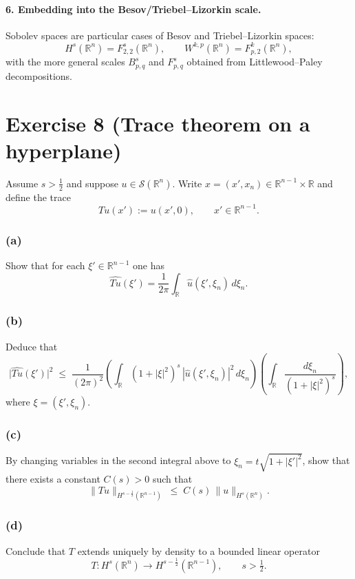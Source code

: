 \documentclass[12pt,a4paper]{article}
\theoremstyle{plain}
\theoremstyle{definition}
\theoremstyle{remark}
\theoremstyle{remark}
\begin{document}
\medskip

\paragraph{6. Embedding into the Besov/Triebel--Lizorkin scale.}
Sobolev spaces are particular cases of Besov and Triebel--Lizorkin spaces:
\[
H^s(\mathbb R^n) = F_{2,2}^s(\mathbb R^n),\qquad
W^{k,p}(\mathbb R^n) = F_{p,2}^k(\mathbb R^n),
\]
with the more general scales $B_{p,q}^s$ and $F_{p,q}^s$ obtained from Littlewood--Paley decompositions.

\section*{Exercise 8 (Trace theorem on a hyperplane)}

Assume $s>\tfrac12$ and suppose $u\in\mathcal S(\mathbb R^n)$.
Write $x=(x',x_n)\in\mathbb R^{n-1}\times\mathbb R$ and define the trace
\[
Tu(x') := u(x',0),\qquad x'\in\mathbb R^{n-1}.
\]

\subsubsection*{(a)}
Show that for each $\xi'\in\mathbb R^{n-1}$ one has
\[
\widehat{Tu}(\xi') = \frac{1}{2\pi}\int_{\mathbb R}\widehat u(\xi',\xi_n)\,d\xi_n.
\]

\subsubsection*{(b)}
Deduce that
\[
\bigl|\widehat{Tu}(\xi')\bigr|^2
\;\le\;
\frac{1}{(2\pi)^2}
\left(\int_{\mathbb R} (1+|\xi|^2)^s\,|\widehat u(\xi',\xi_n)|^2\,d\xi_n\right)
\left(\int_{\mathbb R}\frac{d\xi_n}{(1+|\xi|^2)^s}\right),
\]
where $\xi=(\xi',\xi_n)$.

\subsubsection*{(c)}
By changing variables in the second integral above to
$\xi_n = t\sqrt{1+|\xi'|^2}$, show that there exists a constant $C(s)>0$
such that
\[
\|Tu\|_{H^{s-\frac12}(\mathbb R^{n-1})}
\;\le\; C(s)\,\|u\|_{H^s(\mathbb R^n)}.
\]

\subsubsection*{(d)}
Conclude that $T$ extends uniquely by density to a bounded linear operator
\[
T:H^s(\mathbb R^n)\longrightarrow H^{s-\frac12}(\mathbb R^{n-1}),
\qquad s>\tfrac12.
\]
\end{document}
